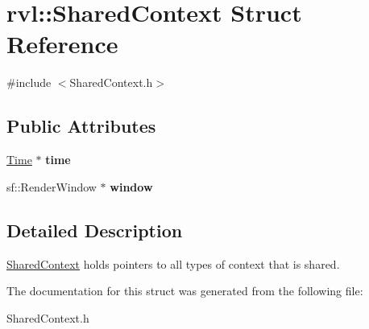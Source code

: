 \hypertarget{structrvl_1_1_shared_context}{}\section{rvl\+:\+:Shared\+Context Struct Reference}
\label{structrvl_1_1_shared_context}


{\ttfamily \#include $<$Shared\+Context.\+h$>$}

\subsection*{Public Attributes}
\begin{DoxyCompactItemize}
\item 
\mbox{\label{structrvl_1_1_shared_context_aa7cc22c51d90b03ebb095f204d138795}} 
\hyperlink{classrvl_1_1_time}{Time} $\ast$ {\bfseries time}
\item 
\mbox{\label{structrvl_1_1_shared_context_a616231b97cd2354f155598b77d76508d}} 
sf\+::\+Render\+Window $\ast$ {\bfseries window}
\end{DoxyCompactItemize}


\subsection{Detailed Description}
\hyperlink{structrvl_1_1_shared_context}{Shared\+Context} holds pointers to all types of context that is shared. 

The documentation for this struct was generated from the following file\+:\begin{DoxyCompactItemize}
\item 
Shared\+Context.\+h\end{DoxyCompactItemize}
